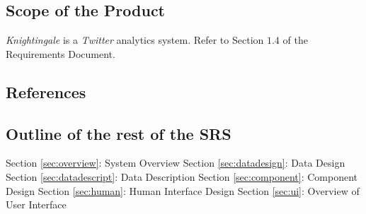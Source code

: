 \documentclass[a4paper, 12pt]{article}
\begin{document}
\subsection{Scope of the Product} \label{sec:scope}
\begin{adjustwidth}{2em}{0pt}
\textit{Knightingale} is a \textit{Twitter} analytics system. Refer to Section $1.4$ of the Requirements Document.
\end{adjustwidth}

\subsection{References} \label{sec:ref}
\begin{adjustwidth}{2em}{0pt}

\end{adjustwidth}

\subsection{Outline of the rest of the SRS} \label{sec:outline}
\begin{adjustwidth}{2em}{0pt}
Section \ref{sec:overview}: System Overview \newline
Section \ref{sec:datadesign}: Data Design \newline
Section \ref{sec:datadescript}: Data Description \newline
Section \ref{sec:component}: Component Design \newline
Section \ref{sec:human}: Human Interface Design \newline
Section \ref{sec:ui}: Overview of User Interface \newline
\end{adjustwidth}
\end{document}
